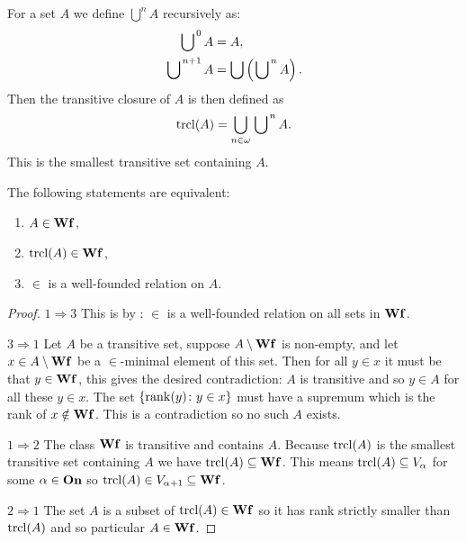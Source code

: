\begin{definition}
    For a set \(A\) we define \(\bigcup^{n}A\) recursively as:
    \begin{align*}
        \left.\bigcup\right.^{0}A   & =A,                                             \\
        \left.\bigcup\right.^{n+1}A & =\bigcup\left(\left.\bigcup\right.^{n}A\right).
    \end{align*}
    Then the transitive closure of \(A\) is then defined as
    \[
        \operatorname{trcl}(A)=\bigcup_{n\in\omega}\left.\bigcup\right.^{n}A.
    \]
    This is the smallest transitive set containing \(A\).
\end{definition}

\begin{proposition}
    The following statements are equivalent:
    \begin{enumerate}
        \item \(A\in{\bf Wf}\),
        \item \(\operatorname{trcl}(A)\in{\bf Wf}\),
        \item \(\in\) is a well-founded relation on \(A\).
    \end{enumerate}

    \begin{proof}
        \(1\Rightarrow3\) This is by : \(\in\) is a
        well-founded relation on all sets in \({\bf Wf}\).

        \(3\Rightarrow1\) Let \(A\) be a transitive set, suppose
        \(A\setminus{\bf Wf}\) is non-empty, and let \(x\in A\setminus{\bf Wf}\) be a
        \(\in\)-minimal element of this set. Then for all \(y\in x\) it must be
        that \(y\in{\bf Wf}\), this gives the desired contradiction: \(A\) is
        transitive and so \(y\in A\) for all these \(y\in x\). The set
        \(\left\{\operatorname{rank}(y)\colon y\in x\right\}\) must have a supremum which is the rank of
        \(x\notin{\bf Wf}\). This is a contradiction so no such \(A\) exists.

        \(1\Rightarrow2\) The class \({\bf Wf}\) is transitive and contains \(A\).
        Because \(\operatorname{trcl}(A)\) is the smallest transitive set containing \(A\) we
        have \(\operatorname{trcl}(A)\subseteq{\bf Wf}\). This means \(\operatorname{trcl}(A)\subseteq
        V_{\alpha}\) for some \(\alpha\in{\bf On}\) so \(\operatorname{trcl}(A)\in
        V_{\alpha+1}\subseteq{\bf Wf}\).

        \(2\Rightarrow1\) The set \(A\) is a subset of \(\operatorname{trcl}(A)\in{\bf Wf}\) so it
        has rank strictly smaller than \(\operatorname{trcl}(A)\) and so particular
        \(A\in{\bf Wf}\).
    \end{proof}
\end{proposition}

